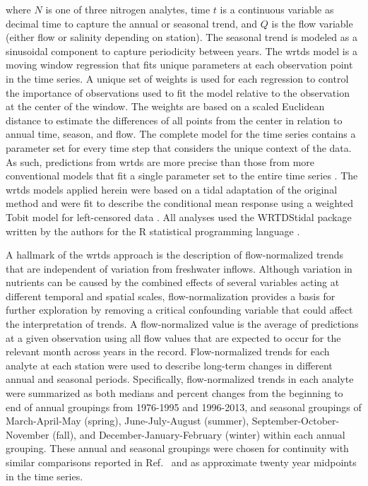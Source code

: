 \documentclass[journal = esthag, manuscript = article]{achemso}\usepackage[]{graphicx}\usepackage[]{color}
\begin{document}
\noindent where $N$ is one of three nitrogen analytes, time $t$ is a continuous variable as decimal time to capture the annual or seasonal trend, and $Q$ is the flow variable (either flow or salinity depending on station).  The seasonal trend is modeled as a sinusoidal component to capture periodicity between years.  The \ac{wrtds} model is a moving window regression that fits unique parameters at each observation point in the time series.  A unique set of weights is used for each regression to control the importance of observations used to fit the model relative to the observation at the center of the window. The weights are based on a scaled Euclidean distance to estimate the differences of all points from the center in relation to annual time, season, and flow. The complete model for the time series contains a parameter set for every time step that considers the unique context of the data.  As such, predictions from \ac{wrtds} are more precise than those from more conventional models that fit a single parameter set to the entire time series \cite{Moyer12,Beck15}.  The \ac{wrtds} models applied herein were based on a tidal adaptation of the original method\cite{Beck15} and were fit to describe the conditional mean response using a weighted Tobit model for left-censored data \cite{Tobin58}. All analyses used the WRTDStidal package written by the authors for the R statistical programming language \cite{Beck16b,RDCT16}.

A hallmark of the \ac{wrtds} approach is the description of flow-normalized trends that are independent of variation from freshwater inflows. Although variation in nutrients can be caused by the combined effects of several variables acting at different temporal and spatial scales, flow-normalization provides a basis for further exploration by removing a critical confounding variable that could affect the interpretation of trends. A flow-normalized value is the average of predictions at a given observation using all flow values that are expected to occur for the relevant month across years in the record.  Flow-normalized trends for each analyte at each station were used to describe long-term changes in different annual and seasonal periods.  Specifically, flow-normalized trends in each analyte were summarized as both medians and percent changes from the beginning to end of annual groupings from 1976-1995 and 1996-2013, and seasonal groupings of March-April-May (spring), June-July-August (summer), September-October-November (fall), and December-January-February (winter) within each annual grouping. These annual and seasonal groupings were chosen for continuity with similar comparisons reported in Ref.~ and as approximate twenty year midpoints in the time series.  
\end{document}
